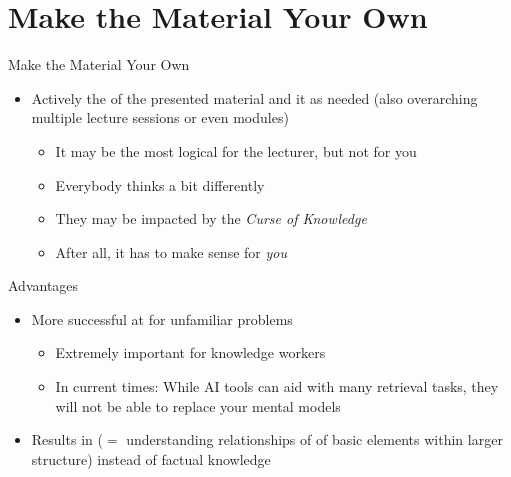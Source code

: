 \documentclass{ercisbeamer}
\begin{document}
\section{Make the Material Your Own}
\begin{frame}{Make the Material Your Own}
    \begin{tbox}
        \begin{itemize}
            \item Actively  the  of the presented material and  it as needed (also overarching multiple lecture sessions or even modules)
            \begin{itemize}
                \item It may be the most logical for the lecturer, but not for you
                \item Everybody thinks a bit differently
                \item They may be impacted by the \emph{Curse of Knowledge}
                \item After all, it has to make sense for \emph{you}
            \end{itemize}
        \end{itemize}
    \end{tbox}
\end{frame}
\setbgimage{}

\begin{frame}{Advantages}
    \begin{itemize}
        \item More successful at  for unfamiliar problems
        \begin{itemize}
            \item Extremely important for knowledge workers
            \item In current times: While AI tools  can aid with many retrieval tasks, they will not be able to replace your mental models 
        \end{itemize}
        \item Results in  ($=$ understanding relationships of of basic elements within larger structure) instead of factual knowledge
    \end{itemize}
\end{frame}
\end{document}
